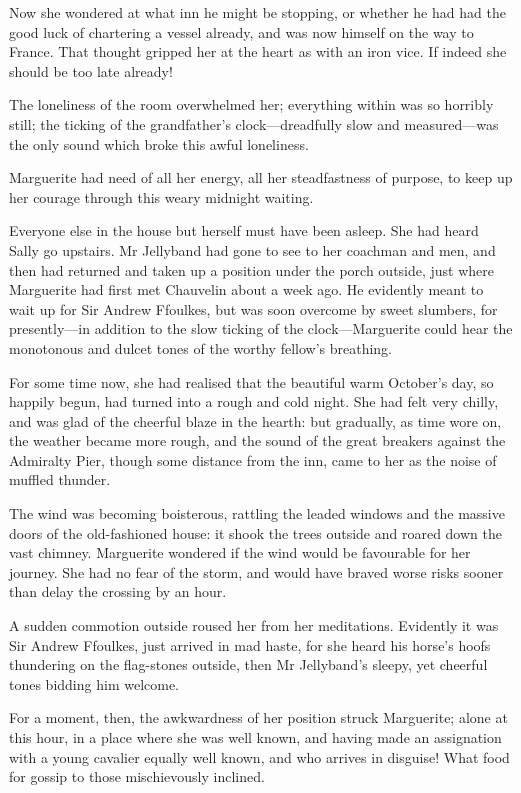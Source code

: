 Now she wondered at what inn he might be stopping, or whether he had had the good luck of chartering a vessel already, and was now himself on the way to France. That thought gripped her at the heart as with an iron vice. If indeed she should be too late already!

The loneliness of the room overwhelmed her; everything within was so horribly still; the ticking of the grandfather's clock---dreadfully slow and measured---was the only sound which broke this awful loneliness.

Marguerite had need of all her energy, all her steadfastness of purpose, to keep up her courage through this weary midnight waiting.

Everyone else in the house but herself must have been asleep. She had heard Sally go upstairs. Mr Jellyband had gone to see to her coachman and men, and then had returned and taken up a position under the porch outside, just where Marguerite had first met Chauvelin about a week ago. He evidently meant to wait up for Sir Andrew Ffoulkes, but was soon overcome by sweet slumbers, for presently---in addition to the slow ticking of the clock---Marguerite could hear the monotonous and dulcet tones of the worthy fellow's breathing.

For some time now, she had realised that the beautiful warm October's day, so happily begun, had turned into a rough and cold night. She had felt very chilly, and was glad of the cheerful blaze in the hearth: but gradually, as time wore on, the weather became more rough, and the sound of the great breakers against the Admiralty Pier, though some distance from the inn, came to her as the noise of muffled thunder.

The wind was becoming boisterous, rattling the leaded windows and the massive doors of the old-fashioned house: it shook the trees outside and roared down the vast chimney. Marguerite wondered if the wind would be favourable for her journey. She had no fear of the storm, and would have braved worse risks sooner than delay the crossing by an hour.

A sudden commotion outside roused her from her meditations. Evidently it was Sir Andrew Ffoulkes, just arrived in mad haste, for she heard his horse's hoofs thundering on the flag-stones outside, then Mr Jellyband's sleepy, yet cheerful tones bidding him welcome.

For a moment, then, the awkwardness of her position struck Marguerite; alone at this hour, in a place where she was well known, and having made an assignation with a young cavalier equally well known, and who arrives in disguise! What food for gossip to those mischievously inclined.

